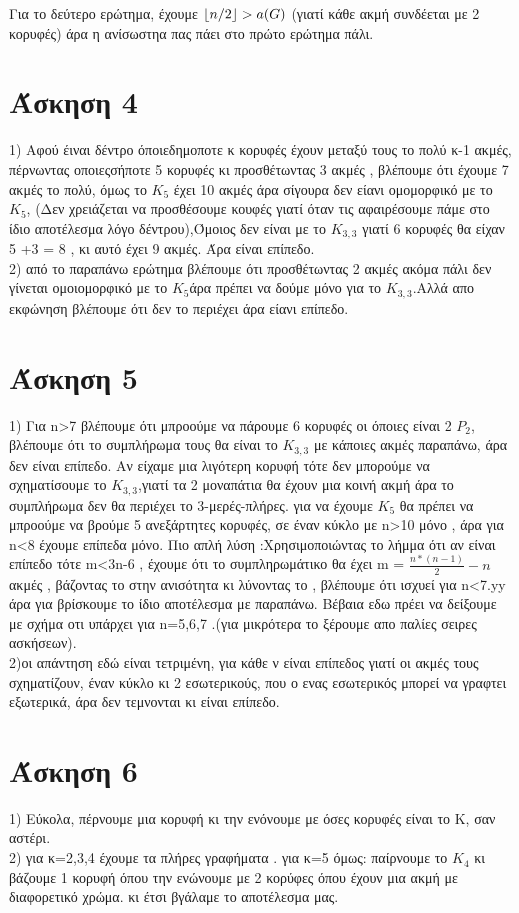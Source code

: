 \documentclass{article}
\DeclarePairedDelimiter\floor{\lfloor}{\rfloor}
\begin{document}
Για το δεύτερο ερώτημα, έχουμε $\floor{n/2} >a(G)$ (γιατί κάθε ακμή συνδέεται με 2 κορυφές) άρα η ανίσωστηα πας πάει στο πρώτο ερώτημα πάλι.
\section*{Άσκηση 4}
1) Αφού έιναι δέντρο όποιεδημοποτε κ κορυφές έχουν μεταξύ τους το πολύ κ-1 ακμές, πέρνωντας οποιεςσήποτε 5 κορυφές κι προσθέτωντας 3 ακμές , βλέπουμε ότι έχουμε 7 ακμές το πολύ, όμως το $K_5$ έχει 10 ακμές άρα σίγουρα δεν είανι ομομορφικό με το $ Κ_5$, (Δεν χρειάζεται να προσθέσουμε κουφές γιατί όταν τις αφαιρέσουμε πάμε στο ίδιο αποτέλεσμα λόγο δέντρου),Όμοιος δεν είναι με το $K_{3,3}$ γιατί 6 κορυφές θα είχαν 5 +3 = 8 , κι αυτό έχει 9 ακμές. Άρα είναι επίπεδο.
\\2) από το παραπάνω ερώτημα βλέπουμε ότι προσθέτωντας 2 ακμές ακόμα πάλι δεν γίνεται ομοιομορφικό με το $K_5$άρα πρέπει να δούμε μόνο για το $Κ_{3,3}$.Αλλά απο εκφώνηση βλέπουμε ότι δεν το περιέχει άρα είανι επίπεδο.
\section*{Άσκηση 5}
1) Για n>7 βλέπουμε ότι μπροούμε να πάρουμε 6 κορυφές οι όποιες είναι 2 $P_2$, βλέπουμε ότι το συμπλήρωμα τους θα είναι το $K_{3,3}$ με κάποιες ακμές παραπάνω, άρα δεν είναι επίπεδο. Αν είχαμε μια λιγότερη κορυφή τότε δεν μπορούμε να σχηματίσουμε το $K_{3,3}$,γιατί τα 2 μοναπάτια θα έχουν μια κοινή ακμή άρα το συμπλήρωμα δεν θα περιέχει το 3-μερές-πλήρες. για να έχουμε $K_5$ θα πρέπει να μπροούμε να βρούμε 5 ανεξάρτητες κορυφές, σε έναν κύκλο με n>10 μόνο , άρα για n<8 έχουμε επίπεδα μόνο.
Πιο απλή λύση :Χρησιμοποιώντας το λήμμα ότι αν είναι επίπεδο τότε m<3n-6 , έχουμε ότι το συμπληρωμάτικο θα έχει  m = $\frac{n*(n-1)}{2} - n$ ακμές , βάζοντας το στην ανισότητα κι λύνοντας το , βλέπουμε ότι ισχυεί για n<7.yy άρα για βρίσκουμε το ίδιο αποτέλεσμα με παραπάνω. Βέβαια εδω πρέει να δείξουμε με σχήμα οτι υπάρχει για n=5,6,7 .(για μικρότερα το ξέρουμε απο παλίες σειρες ασκήσεων).
\\2)οι απάντηση εδώ είναι τετριμένη, για κάθε ν είναι επίπεδος γιατί οι ακμές τους σχηματίζουν, έναν κύκλο κι 2 εσωτερικούς, που ο ενας εσωτερικός μπορεί να γραφτει εξωτερικά, άρα δεν τεμνονται κι είναι επίπεδο. 
\section*{Άσκηση 6}
1) Εύκολα, πέρνουμε μια κορυφή κι την ενόνουμε με όσες κορυφές είναι το Κ, σαν αστέρι. \\
2) για κ=2,3,4 έχουμε τα πλήρες γραφήματα . για κ=5 όμως: παίρνουμε το $K_4$ κι βάζουμε 1 κορυφή όπου την ενώνουμε με 2 κορύφες όπου έχουν μια ακμή με διαφορετικό χρώμα. κι έτσι βγάλαμε το αποτέλεσμα μας.
\end{document}
